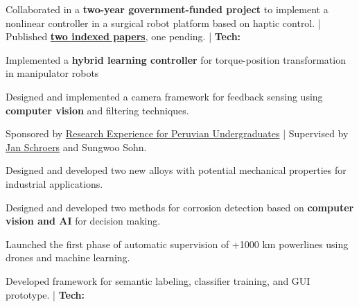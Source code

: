 \documentclass[]{resume-openfont}
\begin{document}
\begin{minipage}[t]{0.95\linewidth}
\begin{tightemize}
    \item Collaborated in a \textbf{two-year government-funded project} to implement a nonlinear controller in a surgical robot platform based on haptic control. | Published \href{https://scholar.google.com/citations?user=KjixlLsAAAAJ&hl=es&oi=ao}{\textbf{two indexed  papers}}, one pending. | \textbf{Tech:}
    \item Implemented a \textbf{hybrid learning controller} for torque-position transformation in manipulator robots
    \item Designed and implemented a camera framework for feedback sensing using \textbf{computer vision} and filtering techniques.
\end{tightemize}

\sectionsep
{}
\begin{tightemize}
    \item Sponsored by \href{https://www.repuprogram.org/nanorepu}{Research Experience for Peruvian Undergraduates} | Supervised by \href{https://seas.yale.edu/faculty-research/faculty-directory/jan-schroers}{Jan Schroers} and Sungwoo Sohn.
    \item Designed and developed two new alloys with potential mechanical properties for industrial applications.
\end{tightemize}

\sectionsep
{}
\begin{tightemize}
    \item Designed and developed two methods for corrosion detection based on \textbf{computer vision and AI} for decision making.
    \item Launched the first phase of automatic supervision of +1000 km powerlines using drones and machine learning.
    \item Developed framework for semantic labeling, classifier training, and GUI prototype. | \textbf{Tech:}  
\end{tightemize}


\end{minipage}
\end{document}
